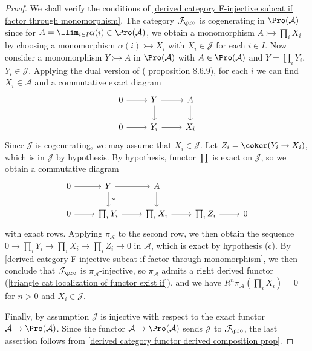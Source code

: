 \begin{proof}
We shall verify the conditions of \cref{derived category F-injective subcat if factor through monomorphism}. The category $\mathcal{J}_{\pro}$ is cogenerating in $\Pro(\mathcal{A})$ since for $A=\llim_{i\in I}\alpha(i)\in\Pro(\mathcal{A})$, we obtain a monomorphism $A\rightarrowtail\prod_iX_i$ by choosing a monomorphism $\alpha(i)\rightarrowtail X_i$ with $X_i\in\mathcal{J}$ for each $i\in I$. Now consider a monomorphism $Y\rightarrowtail A$ in $\Pro(\mathcal{A})$ with $A\in\Pro(\mathcal{A})$ and $Y=\prod_iY_i$, $Y_i\in\mathcal{J}$. Applying the dual version of (\cite{kashiwara_SAC} proposition 8.6.9), for each $i$ we can find $X_i\in\mathcal{A}$ and a commutative exact diagram
\[\begin{tikzcd}
0\ar[r]&Y\ar[r]\ar[d]&A\ar[d]\\
0\ar[r]&Y_i\ar[r]&X_i
\end{tikzcd}\]
Since $\mathcal{J}$ is cogenerating, we may assume that $X_i\in\mathcal{J}$. Let $Z_i=\coker(Y_i\to X_i)$, which is in $\mathcal{J}$ by hypothesis. By hypothesis, functor $\prod$ is exact on $\mathcal{J}$, so we obtain a commutative diagram
\[\begin{tikzcd}
0\ar[r]&Y\ar[r]\ar[d,"\sim"]&A\ar[d]\\
0\ar[r]&\prod_iY_i\ar[r]&\prod_iX_i\ar[r]&\prod_iZ_i\ar[r]&0
\end{tikzcd}\]
with exact rows. Applying $\pi_\mathcal{A}$ to the second row, we then obtain the sequence $0\to \prod_iY_i\to \prod_iX_i\to\prod_iZ_i\to 0$ in $\mathcal{A}$, which is exact by hypothesis (c). By \cref{derived category F-injective subcat if factor through monomorphism}, we then conclude that $\mathcal{J}_{\pro}$ is $\pi_\mathcal{A}$-injective, so $\pi_\mathcal{A}$ admits a right derived functor (\cref{triangle cat localization of functor exist if}), and we have $R^n\pi_\mathcal{A}(\prod_iX_i)=0$ for $n>0$ and $X_i\in\mathcal{J}$.\par
Finally, by assumption $\mathcal{J}$ is injective with respect to the exact functor $\mathcal{A}\to\Pro(\mathcal{A})$. Since the functor $\mathcal{A}\to\Pro(\mathcal{A})$ sends $\mathcal{J}$ to $\mathcal{J}_{\pro}$, the last assertion follows from \cref{derived category functor derived composition prop}.
\end{proof}

